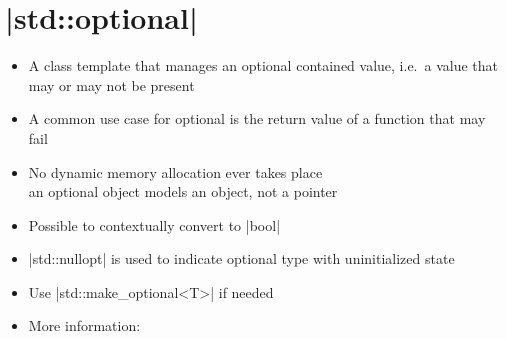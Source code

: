 \section{\CPP|std::optional|}
\begin{frame}[fragile]{\insertsectionhead}
    \vspace{-3mm}
    \begin{itemize}
        \item A class template that manages an optional contained value, i.e.\ a value that may or may not be present
        \item A common use case for optional is the return value of a function that may fail
        \item No dynamic memory allocation ever takes place\\
              \then \alert{an optional object models an object, not a pointer}
        \item Possible to contextually convert to \CPP|bool|
        \item \CPP|std::nullopt| is used to indicate optional type with uninitialized state
        \item Use \CPP|std::make_optional<T>| if needed
        \item More information: 
    \end{itemize}
\end{frame}
